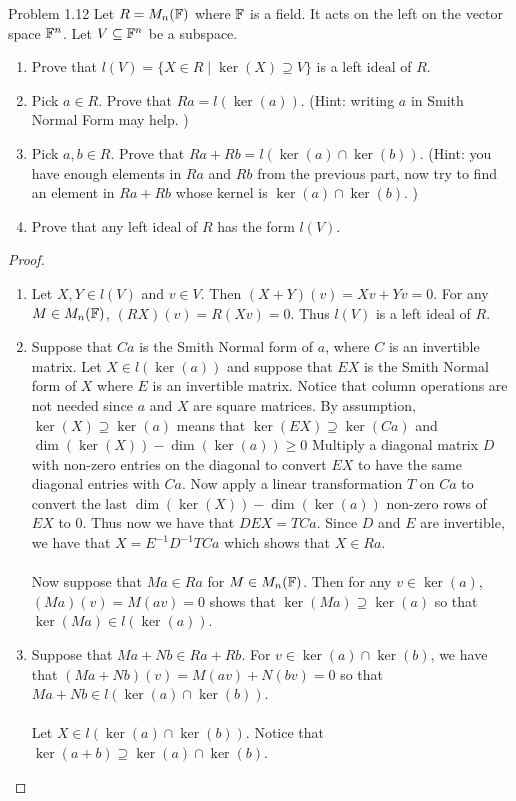 \documentclass[a4paper]{article}
\begin{document}
\begin{ex}{Problem 1.12}{} Let $R=M_n(\mathbb{F})$ where $\mathbb{F}$ is a field. It acts on the left on the vector space $\mathbb{F}^n$. Let $V\subseteq\mathbb{F}^n$ be a subspace. 
\begin{enumerate}
\item Prove that $l(V)=\{X\in R\;|\;\ker(X)\supseteq V\}$ is a left ideal of $R$. 
\item Pick $a\in R$. Prove that $Ra=l(\ker(a))$. (Hint: writing $a$ in Smith Normal Form may help. )
\item Pick $a,b\in R$. Prove that $Ra+Rb=l(\ker(a)\cap\ker(b))$. (Hint: you have enough elements in $Ra$ and $Rb$ from the previous part, now try to find an element in $Ra+Rb$ whose kernel is $\ker(a)\cap\ker(b)$. )
\item Prove that any left ideal of $R$ has the form $l(V)$. 
\end{enumerate} \tcbline
\begin{proof}~\\
\begin{enumerate}
\item Let $X,Y\in l(V)$ and $v\in V$. Then $(X+Y)(v)=Xv+Yv=0$. For any $M\in M_n(\mathbb{F})$, $(RX)(v)=R(Xv)=0$. Thus $l(V)$ is a left ideal of $R$. 
\item Suppose that $Ca$ is the Smith Normal form of $a$, where $C$ is an invertible matrix. Let $X\in l(\ker(a))$ and suppose that $EX$ is the Smith Normal form of $X$ where $E$ is an invertible matrix. Notice that column operations are not needed since $a$ and $X$ are square matrices. By assumption, $\ker(X)\supseteq\ker(a)$ means that $\ker(EX)\supseteq\ker(Ca)$ and $\dim(\ker(X))-\dim(\ker(a))\geq 0$ Multiply a diagonal matrix $D$ with non-zero entries on the diagonal to convert $EX$ to have the same diagonal entries with $Ca$. Now apply a linear transformation $T$ on $Ca$ to convert the last $\dim(\ker(X))-\dim(\ker(a))$ non-zero rows of $EX$ to $0$. Thus now we have that $DEX=TCa$. Since $D$ and $E$ are invertible, we have that $X=E^{-1}D^{-1}TCa$ which shows that $X\in Ra$. \\~\\

Now suppose that $Ma\in Ra$ for $M\in M_n(\mathbb{F})$. Then for any $v\in\ker(a)$, $(Ma)(v)=M(av)=0$ shows that $\ker(Ma)\supseteq\ker(a)$ so that $\ker(Ma)\in l(\ker(a))$. 

\item Suppose that $Ma+Nb\in Ra+Rb$. For $v\in\ker(a)\cap\ker(b)$, we have that $(Ma+Nb)(v)=M(av)+N(bv)=0$ so that $Ma+Nb\in l(\ker(a)\cap\ker(b))$. \\~\\

Let $X\in l(\ker(a)\cap\ker(b))$. Notice that $\ker(a+b)\supseteq\ker(a)\cap\ker(b)$. 
\end{enumerate}
\end{proof}
\end{ex}
\end{document}
